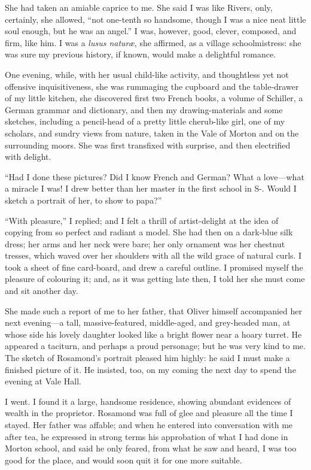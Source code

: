 She had taken an amiable caprice to me. She said I was like \Mr{} Rivers,
only, certainly, she allowed, \enquote{not one-tenth so handsome, though
I was a nice neat little soul enough, but he was an angel.} I was,
however, good, clever, composed, and firm, like him. I was a
\emph{lusus naturæ}, she affirmed, as a village schoolmistress: she was
sure my previous history, if known, would make a delightful romance.

One evening, while, with her usual child-like activity, and thoughtless
yet not offensive inquisitiveness, she was rummaging the cupboard and
the table-drawer of my little kitchen, she discovered first two French
books, a volume of Schiller, a German grammar and dictionary, and then
my drawing-materials and some sketches, including a pencil-head of a
pretty little cherub-like girl, one of my scholars, and sundry views
from nature, taken in the Vale of Morton and on the surrounding moors. 
She was first transfixed with surprise, and then electrified with
delight.

\enquote{Had I done these pictures? Did I know French and German? What
a love---what a miracle I was! I drew better than her master in the
first school in S-. Would I sketch a portrait of her, to show to papa?}

\enquote{With pleasure,} I replied; and I felt a thrill of
artist-delight at the idea of copying from so perfect and radiant a
model. She had then on a dark-blue silk dress; her arms and her neck
were bare; her only ornament was her chestnut tresses, which waved over
her shoulders with all the wild grace of natural curls. I took a sheet
of fine card-board, and drew a careful outline. I promised myself the
pleasure of colouring it; and, as it was getting late then, I told her
she must come and sit another day.

She made such a report of me to her father, that \Mr{} Oliver himself
accompanied her next evening---a tall, massive-featured, middle-aged,
and grey-headed man, at whose side his lovely daughter looked like a
bright flower near a hoary turret. He appeared a taciturn, and perhaps
a proud personage; but he was very kind to me. The sketch of Rosamond's
portrait pleased him highly: he said I must make a finished picture of
it. He insisted, too, on my coming the next day to spend the evening at
Vale Hall.

I went. I found it a large, handsome residence, showing abundant
evidences of wealth in the proprietor. Rosamond was full of glee and
pleasure all the time I stayed. Her father was affable; and when he
entered into conversation with me after tea, he expressed in strong
terms his approbation of what I had done in Morton school, and said he
only feared, from what he saw and heard, I was too good for the place,
and would soon quit it for one more suitable.

